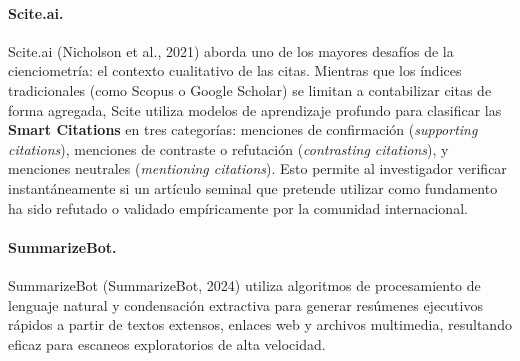 \paragraph{Scite.ai.}
Scite.ai (Nicholson et al., 2021) aborda uno de los mayores desafíos de la cienciometría: el contexto cualitativo de las citas. Mientras que los índices tradicionales (como Scopus o Google Scholar) se limitan a contabilizar citas de forma agregada, Scite utiliza modelos de aprendizaje profundo para clasificar las \textbf{Smart Citations} en tres categorías: menciones de confirmación (\textit{supporting citations}), menciones de contraste o refutación (\textit{contrasting citations}), y menciones neutrales (\textit{mentioning citations}). Esto permite al investigador verificar instantáneamente si un artículo seminal que pretende utilizar como fundamento ha sido refutado o validado empíricamente por la comunidad internacional.

\paragraph{SummarizeBot.}
SummarizeBot (SummarizeBot, 2024) utiliza algoritmos de procesamiento de lenguaje natural y condensación extractiva para generar resúmenes ejecutivos rápidos a partir de textos extensos, enlaces web y archivos multimedia, resultando eficaz para escaneos exploratorios de alta velocidad.

